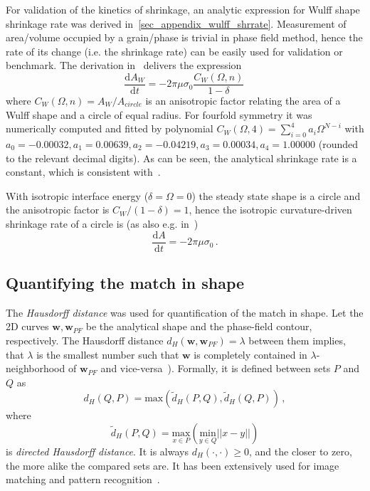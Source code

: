 For validation of the kinetics of shrinkage, an analytic expression for Wulff shape shrinkage rate was derived in~\ref{sec_appendix_wulff_shrrate}. Measurement of area/volume occupied by a grain/phase is trivial in phase field method, hence the rate of its change (i.e. the shrinkage rate) can be easily used for validation or benchmark. The derivation in~\cite{Minar2021suppl} delivers the expression
\begin{equation}\label{eq_wulff_shrrate}
	\frac{\mathrm{d}A_W}{\mathrm{d}t} = -2\pi\mu\sigma_0  \frac{C_W(\Omega,n)}{1-\delta} \,
\end{equation}
where $C_W(\Omega,n)=A_W/A_{circle}$ is an anisotropic factor relating the area of a Wulff shape and a circle of equal radius. For fourfold symmetry it was numerically computed and fitted by polynomial $C_W(\Omega,4)= \sum_{i=0}^4a_i\Omega^{N-i}$ with $a_0=-0.00032 ,a_1=0.00639 ,a_2=-0.04219 , a_3=0.00034 , a_4=1.00000$ (rounded to the relevant decimal digits). As can be seen, the analytical shrinkage rate is a constant, which is consistent with~\cite{Taylor1998}.

With isotropic interface energy ($\delta=\Omega=0$) the steady state shape is a circle and the anisotropic factor is $C_W/(1-\delta)=1$, hence the isotropic curvature-driven shrinkage rate of a circle is (as also e.g. in~\cite{Moelans2009})
\begin{equation} \label{eq_iso_shrrate}
	\frac{\mathrm{d}A}{\mathrm{d}t} = -2\pi\mu\sigma_0 \,.
\end{equation}

\subsection{Quantifying the match in shape}
The \textit{Hausdorff distance} was used for quantification of the match in shape. Let the 2D curves $\bm{w},\bm{w}_{PF}$ be the analytical shape and the phase-field contour, respectively. The Hausdorff distance $d_H(\bm{w},\bm{w}_{PF})=\lambda$ between them implies, that $\lambda$ is the smallest number such that $ \bm{w} $ is completely contained in $\lambda$-neighborhood of $\bm{w}_{PF}$ and vice-versa~\cite{Alt2004}). Formally, it is defined between sets $P$ and $Q$ as 
\begin{equation}
	d_H(Q,P)=\mathrm{max}(\tilde{d}_H(P,Q),\tilde{d}_H(Q,P)) \,,
\end{equation}
where 
\begin{equation}
	\tilde{d}_H(P,Q)=\underset{x\in P}{\mathrm{max}}( \underset{y\in Q}{\mathrm{min}}||x-y|| )
\end{equation}
is \textit{directed Hausdorff distance}. It is always $d_H(\cdot,\cdot)\geq 0$, and the closer to zero, the more alike the compared sets are. It has been extensively used for image matching and pattern recognition~\cite{LiZhu2014}. 

